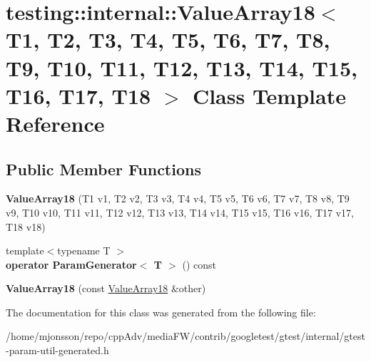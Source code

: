 \hypertarget{classtesting_1_1internal_1_1ValueArray18}{}\section{testing\+:\+:internal\+:\+:Value\+Array18$<$ T1, T2, T3, T4, T5, T6, T7, T8, T9, T10, T11, T12, T13, T14, T15, T16, T17, T18 $>$ Class Template Reference}
\label{classtesting_1_1internal_1_1ValueArray18}
\subsection*{Public Member Functions}
\begin{DoxyCompactItemize}
\item 
\mbox{\label{classtesting_1_1internal_1_1ValueArray18_adf8554745ebde65aba76a7bc6c1a5a06}} 
{\bfseries Value\+Array18} (T1 v1, T2 v2, T3 v3, T4 v4, T5 v5, T6 v6, T7 v7, T8 v8, T9 v9, T10 v10, T11 v11, T12 v12, T13 v13, T14 v14, T15 v15, T16 v16, T17 v17, T18 v18)
\item 
\mbox{\label{classtesting_1_1internal_1_1ValueArray18_a403e37450f8f4b21d38890d172ec57c0}} 
{\footnotesize template$<$typename T $>$ }\\{\bfseries operator Param\+Generator$<$ T $>$} () const
\item 
\mbox{\label{classtesting_1_1internal_1_1ValueArray18_a09150c1d1ee21f7bec61f673b2b8cae0}} 
{\bfseries Value\+Array18} (const \hyperlink{classtesting_1_1internal_1_1ValueArray18}{Value\+Array18} \&other)
\end{DoxyCompactItemize}


The documentation for this class was generated from the following file\+:\begin{DoxyCompactItemize}
\item 
/home/mjonsson/repo/cpp\+Adv/media\+F\+W/contrib/googletest/gtest/internal/gtest-\/param-\/util-\/generated.\+h\end{DoxyCompactItemize}

